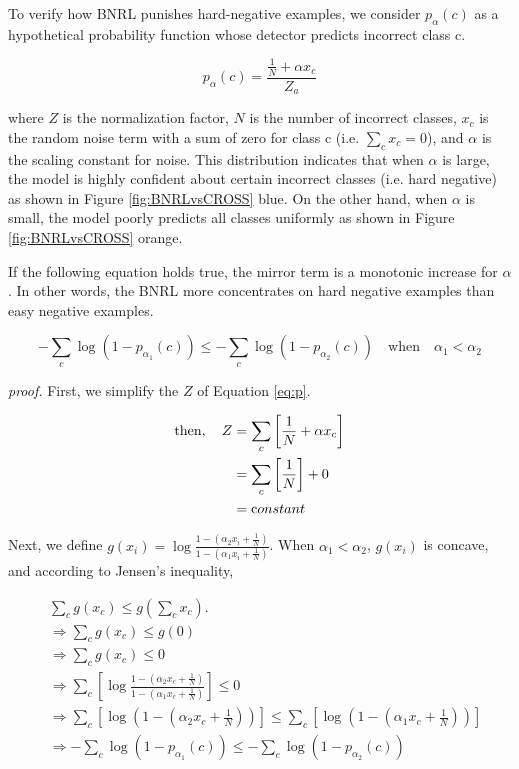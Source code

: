 \documentclass{article}
\begin{document}
To verify how BNRL punishes hard-negative examples, we consider $p_\alpha(c)$ as a hypothetical probability function whose detector predicts incorrect class c.

\begin{equation} 
p_\alpha(c) = \frac{ \frac{1}{N} + \alpha x_{c}}{Z_a}
\label{eq:p}
\end{equation}

where $Z$ is the normalization factor, $N$ is the number of incorrect classes, $x_{c}$ is the random noise term with a sum of zero for class c (i.e. $\sum_c{x_{c}} = 0$), and $\alpha$ is the scaling constant for noise.
This distribution indicates that when $\alpha$ is large, the model is highly confident about certain incorrect classes (i.e. hard negative) as shown in Figure \ref{fig:BNRLvsCROSS} blue. On the other hand, when $\alpha$ is small, the model poorly predicts all classes uniformly as shown in Figure \ref{fig:BNRLvsCROSS} orange.

If the following equation holds true, the mirror term is a monotonic increase for $\alpha$.
In other words, the BNRL more concentrates on hard negative examples than easy negative examples.

\begin{equation} - \sum_c \log (1-p_{\alpha_1}(c)) \leq - \sum_c \log (1-p_{\alpha_2}(c)) \quad \text{when} \quad \alpha_1 < \alpha_2 \end{equation}

{\it proof.} 
First, we simplify the $Z$ of Equation \ref{eq:p}.

\begin{equation}
\begin{split}
    \text{then}, \quad Z &= \sum_c \left[ \frac{1}{N} + \alpha x_{c} \right] \\
    &= \sum_c \left[ \frac{1}{N} \right] + 0  \\
    &= {\text constant}
\end{split}
\end{equation}

Next, we define $g(x_i) = \log \frac{1- (\alpha_2 x_i + \frac{1}{N})}{1-(\alpha_1 x_i + \frac{1}{N})}$.
When $\alpha_1 < \alpha_2$, $g(x_i)$ is concave, and according to Jensen's inequality, 

\begin{equation}
\begin{split}
    &\sum_c g(x_c) \leq g\left(\sum_c x_c\right).\\
    & \Rightarrow  \sum_c g(x_c) \leq g(0)\\
    & \Rightarrow \sum_c g(x_c) \leq 0 \\
    & \Rightarrow  \sum_c \left[ \log \frac{1 - (\alpha_2 x_{c} + \frac{1}{N})}{1 - (\alpha_1 x_{c} + \frac{1}{N})} \right] \leq 0 \\
    & \Rightarrow  \sum_c \left[ \log\left(1 - \left({\alpha_2 x_{c}+\frac{1}{N}}\right)\right) \right]   \leq \sum_c \left[ \log\left(1 - \left({\alpha_1 x_{c} + \frac{1}{N} }\right)\right)\right]  \\
    & \Rightarrow - \sum_c \log (1 -  p_{\alpha_1}(c)) \leq - \sum_c \log (1 - p_{\alpha_2}(c))
\end{split}    
\label{eq:proove}
\end{equation}
\end{document}

